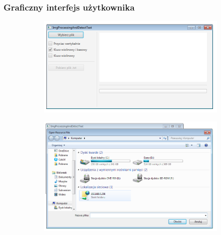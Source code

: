 \documentclass[a4paper,12pt]{article}
\begin{document}
        \subsubsection{Graficzny interfejs użytkownika}
	        \begin{figure}[h!]
                \centering
                \begin{subfigure}[b]{0.47\linewidth}
                    \includegraphics[width=\linewidth]{image//gui//app001.png}
					\caption{}
                \end{subfigure}
                \begin{subfigure}[b]{0.47\linewidth}
                     \includegraphics[width=\linewidth]{image//gui//app002.png}
					\caption{}
                \end{subfigure}
                \newline
                

\end{figure}
\end{document}
